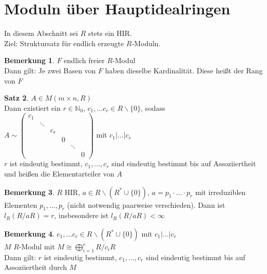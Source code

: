 \documentclass[10pt,a4paper,numbers=endperiod]{scrartcl}
\theoremstyle{definition}
\newtheorem{satz}{Satz}[section]
\newtheorem{bem}[satz]{Bemerkung}
\def\NN{{\mathbb N}}
\begin{document}
\section{Moduln über Hauptidealringen}

In diesem Abschnitt sei $R$ stets ein HIR.\\

Ziel: Struktursatz für endlich erzeugte $R$-Moduln.

\begin{bem}
	$F$ endlich freier $R$-Modul\\
	Dann gilt: Je zwei Basen von $F$ haben dieselbe Kardinalität. Diese heißt der Rang von $F$
\end{bem}

\begin{satz}
	$A \in M(m \times n, R)$\\
	Dann existiert ein $r \in \NN_0$, $c_1, \ldots c_r \in R \backslash \{0\}$, sodass\\
	$A \sim \begin{pmatrix}
	c_1 & & & & &\\
	& \ddots & & & &\\
	& & c_r & & &\\
	& & & 0 & &\\
	& & & & \ddots &\\
	& & & & & 0
	\end{pmatrix}$ mit $c_1|\ldots|c_r$\\
	$r$ ist eindeutig bestimmt, $c_1, \ldots, c_r$ sind eindeutig bestimmt bis auf Assoziiertheit und heißen die Elementarteiler von $A$
\end{satz}

\begin{bem}
	$R$ HIR, $a \in R \backslash (R^* \cup \{0\})$, $a = p_1 \cdot \ldots \cdot p_r$ mit irreduziblen Elementen $p_1, \ldots, p_r$ (nicht notwendig paarweise verschieden). Dann ist\\
	$l_R(R/aR) = r$, insbesondere ist $l_R(R/aR) < \infty$
\end{bem}

\begin{bem}
	$c_1, \ldots c_r \in R \backslash (R^* \cup \{0\})$ mit $c_1|\ldots|c_r$\\
	$M$ $R$-Modul mit $M \cong \bigoplus\limits_{i = 1}^r R/c_iR$\\
	Dann gilt: $r$ ist eindeutig bestimmt, $c_1, \ldots, c_r$ sind eindeutig bestimmt bis auf Assoziiertheit durch $M$
\end{bem}
\end{document}
